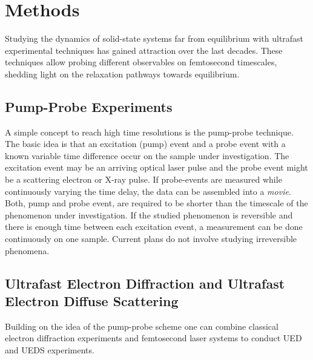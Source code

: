 \section{Methods}
Studying the dynamics of solid-state systems far from equilibrium with ultrafast experimental techniques has gained attraction over the last decades.
These techniques allow probing different observables on femtosecond timescales, shedding light on the relaxation pathways towards equilibrium.

\subsection{Pump-Probe Experiments}
A simple concept to reach high time resolutions is the pump-probe technique.
The basic idea is that an excitation (pump) event and a probe event with a known variable time difference occur on the sample under investigation.
The excitation event may be an arriving optical laser pulse and the probe event might be a scattering electron or X-ray pulse.
If probe-events are measured while continuously varying the time delay, the data can be assembled into a \emph{movie}.
Both, pump and probe event, are required to be shorter than the timescale of the phenomenon under investigation.
If the studied phenomenon is reversible and there is enough time between each excitation event, a measurement can be done continuously on one sample.
Current plans do not involve studying irreversible phenomena.

\subsection{Ultrafast Electron Diffraction and Ultrafast Electron Diffuse Scattering}
Building on the idea of the pump-probe scheme one can combine classical electron diffraction experiments and femtosecond laser systems to conduct \ac{UED} and \ac{UEDS} experiments.

